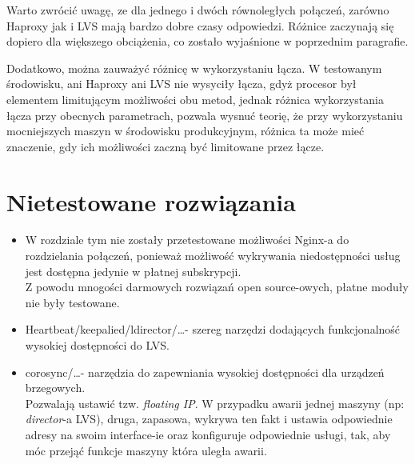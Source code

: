 Warto zwrócić uwagę, ze dla jednego i dwóch równoległych połączeń, zarówno Haproxy jak i LVS mają bardzo dobre czasy odpowiedzi.
Różnice zaczynają się dopiero dla większego obciążenia, co zostało wyjaśnione w poprzednim paragrafie.

Dodatkowo, można zauważyć różnicę w wykorzystaniu łącza.
W testowanym środowisku, ani Haproxy ani LVS nie wysyciły łącza, gdyż procesor był elementem limitującym możliwości obu metod, jednak różnica wykorzystania łącza przy obecnych parametrach, pozwala wysnuć teorię, że przy wykorzystaniu mocniejszych maszyn w środowisku produkcyjnym, różnica ta może mieć znaczenie, gdy ich możliwości zaczną być limitowane przez łącze.
\section{Nietestowane rozwiązania}
\begin{itemize}
	\item W rozdziale tym nie zostały przetestowane możliwości Nginx-a do rozdzielania połączeń, ponieważ możliwość wykrywania niedostępności usług jest dostępna jedynie w płatnej subskrypcji.\\
		Z powodu mnogości darmowych rozwiązań open source-owych, płatne moduły nie były testowane.
	\item Heartbeat/keepalied/ldirector/\ldots - szereg narzędzi dodających funkcjonalność wysokiej dostępności do LVS.
	\item corosync/\ldots - narzędzia do zapewniania wysokiej dostępności dla urządzeń brzegowych.\\
		Pozwalają ustawić tzw. \textit{floating IP}.
		W przypadku awarii jednej maszyny (np: \textit{director}-a LVS), druga, zapasowa, wykrywa ten fakt i ustawia odpowiednie adresy na swoim interface-ie oraz konfiguruje odpowiednie usługi, tak, aby móc przejąć funkcje maszyny która uległa awarii.
\end{itemize}
